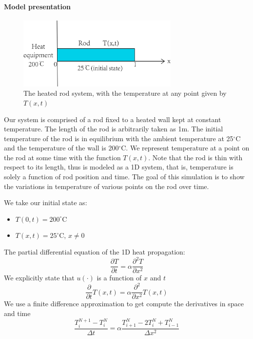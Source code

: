 

\paragraph{Model presentation}

\begin{figure}[htb]
	\centering
	\includegraphics[width=8cm]{Figures/Heat1D_model.png}       
	\caption{The heated rod system, with the temperature at any point given by $T(x,t)$ }
	\label{Heat1D_model.fig}
\end{figure}

Our system is comprised of a rod fixed to a heated wall kept at constant temperature. The length of the rod is arbitrarily taken as 1m. The initial temperature of the rod is in equilibrium with the ambient temperature at 25$^{\circ} $C and the temperature of the wall is 200$^{\circ} $C.  We represent temperature at a point on the rod at some time with the function $T(x,t)$. Note that the rod is thin with respect to its length, thus is modeled as a 1D system, that is, temperature is solely a function of rod position and time. The goal of this simulation is to show the variations in temperature of various points on the rod over time. 

We take our initial state as:
\begin{itemize}
	\item $T(0,t)=200 ^{\circ}$C
    \item $T(x,t)=25 ^{\circ}$C, $x\ne 0$
\end{itemize}

\noindent The partial differential equation of the 1D heat propagation:
\begin{equation}
 \frac{\partial T}{\partial t} = \alpha \frac{\partial^2 T}{\partial x^2}
\end{equation}
\noindent We explicitly state that $u(\cdot)$ is a function of $x$ and $t$
\begin{equation}
 \frac{\partial} {\partial t}T(x,t) = \alpha \frac{\partial^2}{\partial x^2}T(x,t)
\end{equation}
\noindent We use a finite difference approximation to get compute the derivatives in space and time
\begin{equation}
\frac{T_{i}^{N+1}-T_{i}^{N}}{\Delta t} =\alpha\frac{T_{i+1}^{N}-2T_{i}^{N}+T_{i-1}^{N}}{\Delta x^2}
\end{equation}

